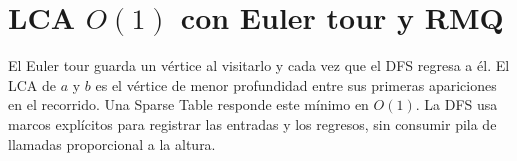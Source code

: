 \section{LCA $O(1)$ con Euler tour y RMQ}

El Euler tour guarda un vértice al visitarlo y cada vez que el DFS regresa a él.
El LCA de $a$ y $b$ es el vértice de menor profundidad entre sus primeras
apariciones en el recorrido. Una Sparse Table responde este mínimo en $O(1)$.
La DFS usa marcos explícitos para registrar las entradas y los regresos, sin
consumir pila de llamadas proporcional a la altura.


